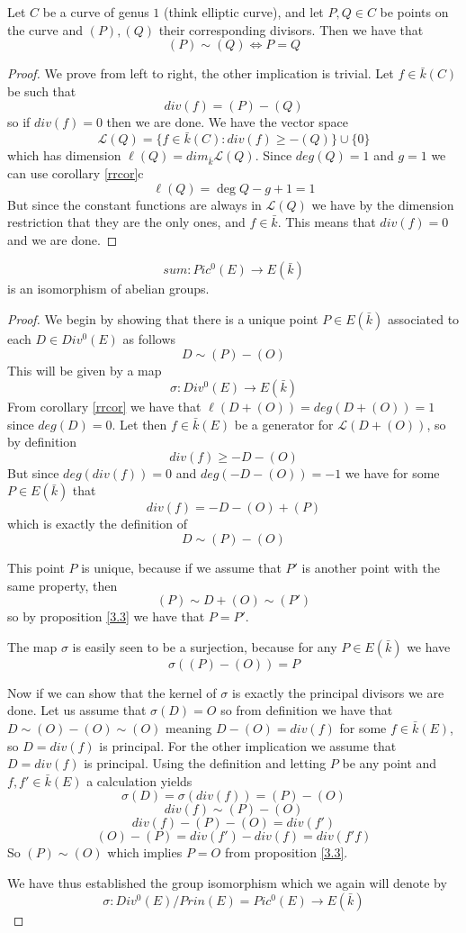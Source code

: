 \begin{prop} \label{3.3}
 Let $C$ be a curve of genus $1$ (think elliptic curve), and let $P,Q\in C$ be points on the curve and
$(P), (Q)$ their corresponding divisors. Then we have that
$$ (P) \sim (Q) \iff P = Q $$
\end{prop}
\begin{proof}
 We prove from left to right, the other implication is trivial. Let $f\in \bar{k}(C)$ be such that
$$ div(f) = (P)-(Q) $$
so if $div(f) = 0$ then we are done. We have the vector space
$$ \mathscr{L}(Q) = \{ f\in \bar{k}(C) : div(f) \geq -(Q) \} \cup \{ 0 \} $$
which has dimension $\ell(Q) = dim_{\bar{k}} \mathscr{L}(Q)$. Since $deg(Q) = 1$ and $g = 1$
we can use corollary \ref{rrcor}c 
$$\ell(Q) = \deg Q - g + 1 = 1$$
But since the constant functions are always in $\mathscr{L}(Q)$ we have by the dimension restriction that
they are the only ones, and $f \in \bar{k}$. This means that $div(f) = 0$ and we are done.
\end{proof}

\begin{thm} \label{isoteorem}
 $$ sum: Pic^0(E) \rightarrow E(\bar{k}) $$
is an isomorphism of abelian groups.
\end{thm}
\begin{proof}
 We begin by showing that there is a unique point $P \in E(\bar{k})$ associated to
each $D \in Div^0(E)$ as follows
$$ D \sim (P) -(O) $$
This will be given by a map
$$ \sigma: Div^0(E) \rightarrow E(\bar{k}) $$
From corollary \ref{rrcor} we have that $\ell(D+(O)) = deg(D+(O)) = 1$ since $deg(D) = 0$.
Let then $f \in \bar{k}(E)$ be a generator for $\mathscr{L}(D+(O))$, so by definition
$$ div(f) \geq -D-(O) $$
But since $deg(div(f)) = 0$ and $deg(-D-(O)) = -1$ we have for some $P \in E(\bar{k})$ that
$$ div(f) = -D-(O)+(P) $$
which is exactly the definition of
$$ D \sim (P) - (O) $$

This point $P$ is unique, because if we assume that $P'$ is another point with the same
property, then
$$ (P) \sim D + (O) \sim (P') $$
so by proposition \ref{3.3} we have that $ P = P'$.

The map $\sigma$ is easily seen to be a surjection, because for any $P \in E(\bar{k})$ we have
$$ \sigma((P)-(O)) = P $$

Now if we can show that the kernel of $\sigma$ is exactly the principal divisors we are done.
Let us assume that $\sigma(D) = O$ so from definition we have that $D \sim (O)-(O) \sim (O)$
meaning $D - (O) = div(f)$ for some $f \in \bar{k}(E)$, so $D = div(f)$ is principal.
For the other implication we assume that $D = div(f)$ is principal. Using the definition and
letting $P$ be any point and $f, f' \in \bar{k}(E)$ a calculation yields
$$ \sigma(D) = \sigma(div(f)) = (P)-(O) $$
$$ div(f) \sim (P) - (O) $$
$$ div(f) - (P) - (O) = div(f') $$
$$ (O) - (P) = div(f') - div(f) = div(f' f) $$
So $ (P) \sim (O) $ which implies $P = O$ from proposition \ref{3.3}.

We have thus established the group isomorphism which we again will denote by
$$ \sigma : Div^0(E)/Prin(E) = Pic^0(E) \rightarrow E(\bar{k}) $$

\end{proof}

